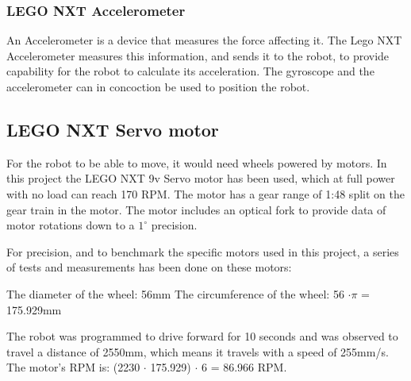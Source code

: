 \subsubsection{LEGO NXT Accelerometer}
\label{sec:LEGO NXT Accelerometer}
An Accelerometer is a device that measures the force affecting it. The Lego NXT Accelerometer measures this information, and sends it to the robot, to provide capability for the robot to calculate its acceleration. The gyroscope and the accelerometer can in concoction be used to position the robot.

\subsection{LEGO NXT Servo motor}
\label{sec:LEGO NXT Servo motor}
For the robot to be able to move, it would need wheels powered by motors. In this project the LEGO NXT 9v Servo motor has been used, which at full power with no load can reach 170 RPM. The motor has a gear range of 1:48 split on the gear train in the motor. \citep{Servo} The motor includes an optical fork to provide data of motor rotations down to a \(1^{\circ}\) precision.

For precision, and to benchmark the specific motors used in this project, a series of tests and measurements has been done on these motors:

The diameter of the wheel: 56mm \newline
The circumference of the wheel: 56 \begin{math}\cdot \pi \end{math} = 175.929mm

The robot was programmed to drive forward for 10 seconds and was observed to travel a distance of 2550mm, which means it travels with a speed of 255mm/s. \newline
The motor’s RPM is: (2230 \begin{math} \cdot \end{math} 175.929) \begin{math} \cdot \end{math} 6 = 86.966 RPM.


